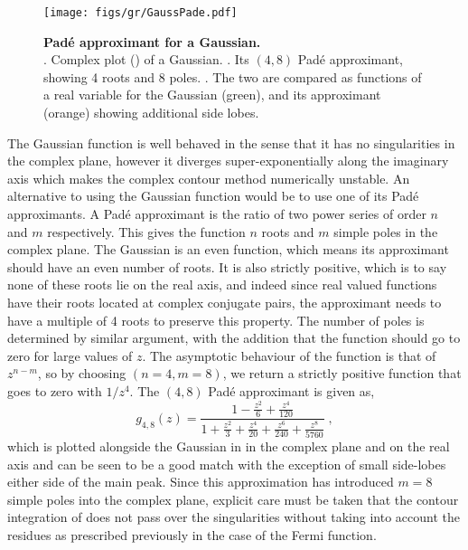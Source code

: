 \begin{figure}
 \texttt{[image: figs/gr/GaussPade.pdf]}
 \caption[Padé approximant for a Gaussian]{ \label{fig:GaussPade}
\textbf{Padé approximant for a Gaussian.}\small\\
\subA. Complex plot () of a Gaussian.
\subB. Its $(4,8)$ Padé approximant, showing 4 roots and 8 poles.
\subC. The two are compared as functions of a real variable for the Gaussian
(green), and its approximant (orange) showing additional side lobes.
}
\end{figure}
The Gaussian function is well behaved in the sense that it has no singularities
in the complex plane, however it diverges super-exponentially along the
imaginary axis which makes the complex contour method numerically unstable.
An alternative to using the Gaussian function would be to use one of its Padé
approximants.
A Padé approximant is the ratio of two power series of order $n$ and $m$
respectively.
This gives the function $n$ roots and $m$ simple poles in the complex plane.
The Gaussian is an even function, which means its approximant should have an
even number of roots.
It is also strictly positive, which is to say none of these roots lie on the
real axis, and indeed since real valued functions have their roots located at
complex conjugate pairs, the approximant needs to have a multiple of 4 roots to
preserve this property.
The number of poles is determined by similar argument, with the addition that
the function should go to zero for large values of $z$.
The asymptotic behaviour of the function is that of $z^{n-m}$, so by choosing
$(n=4, m=8)$, we return a strictly positive function that goes to zero with
$1/z^4$.
The $(4,8)$ Padé approximant is given as,
\begin{equation}
g_{4,8}(z) =
\frac{1 - \frac{z^2}{6} + \frac{z^4}{120} }
     {1 + \frac{z^2}{3} + \frac{z^4}{20} + \frac{z^6}{240} + \frac{z^8}{5760} }
\;,
\end{equation}
which is plotted alongside the Gaussian in  in the complex
plane and on the real axis and can be seen to be a good match with the exception
of small side-lobes either side of the main peak.
Since this approximation has introduced $m=8$ simple poles into the complex
plane, explicit care must be taken that the contour integration of
 does not pass over the singularities without taking into account
the residues as prescribed previously in the case of the Fermi function.

